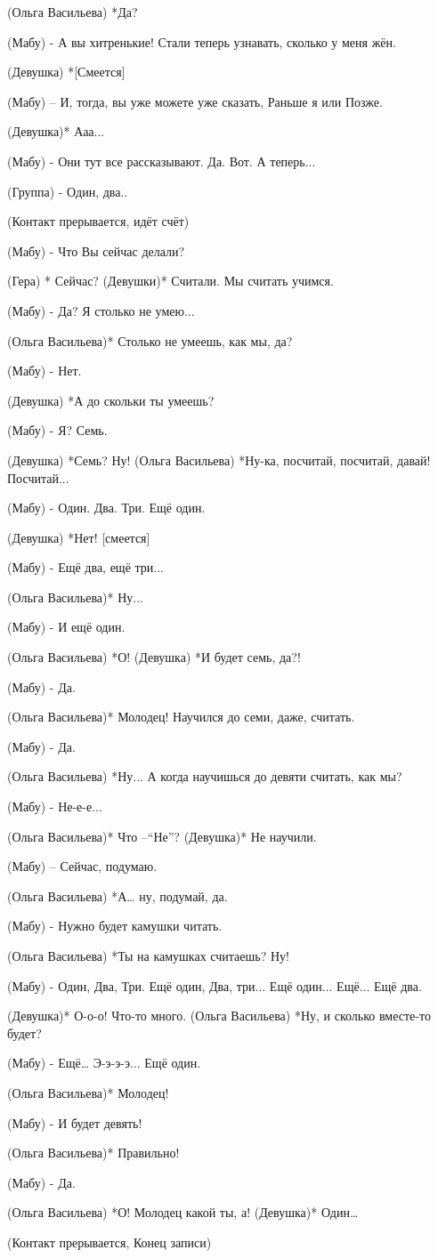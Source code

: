 (Ольга Васильева) *Да?

(Мабу) - А вы хитренькие! Стали теперь узнавать, сколько у меня жён.

(Девушка) *[Смеется]

(Мабу) – И, тогда, вы уже можете уже сказать, Раньше я или Позже. 

(Девушка)* Ааа...

(Мабу) - Они тут все рассказывают. Да. Вот. А теперь...

(Группа) - Один, два..

(Контакт прерывается, идёт счёт)

(Мабу) - Что Вы сейчас делали?

(Гера) * Сейчас?
(Девушки)* Считали. Мы считать учимся.

(Мабу) - Да? Я столько не умею...

(Ольга Васильева)* Столько не умеешь, как мы, да?

(Мабу) - Нет.

(Девушка) *А до скольки ты умеешь?

(Мабу) - Я? Семь.

(Девушка) *Семь? Ну!
(Ольга Васильева) *Ну-ка, посчитай, посчитай, давай! Посчитай...

(Мабу) - Один. Два. Три. Ещё один.

(Девушка) *Нет! [смеется]

(Мабу) - Ещё два, ещё три...

(Ольга Васильева)* Ну...

(Мабу) - И ещё один.

(Ольга Васильева) *О!
(Девушка) *И будет семь, да?!

(Мабу) - Да.

(Ольга Васильева)* Молодец! Научился до семи, даже, считать.

(Мабу) - Да.

(Ольга Васильева) *Ну... А когда научишься до девяти считать, как мы?

(Мабу) - Не-е-е...

(Ольга Васильева)* Что –“Не”?
(Девушка)* Не научили.

(Мабу) – Сейчас, подумаю.

(Ольга Васильева) *А… ну, подумай, да.

(Мабу) - Нужно будет камушки читать.

(Ольга Васильева) *Ты на камушках считаешь? Ну!

(Мабу) - Один, Два, Три. Ещё один, Два, три... Ещё один... Ещё... Ещё два.

(Девушка)* О-о-о! Что-то много.
(Ольга Васильева) *Ну, и сколько вместе-то будет?

(Мабу) - Ещё… Э-э-э-э... Ещё один.

(Ольга Васильева)* Молодец!

(Мабу) - И будет девять!

(Ольга Васильева)* Правильно!

(Мабу) - Да.

(Ольга Васильева) *О! Молодец какой ты, а!
(Девушка)* Один…

(Контакт прерывается, Конец записи)